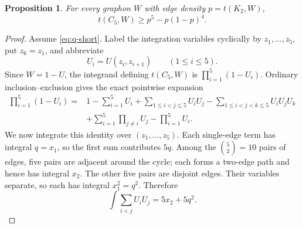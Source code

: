 \documentclass[11pt]{article}
\newtheorem{proposition}[theorem]{Proposition}
\begin{document}
\begin{proposition}\label{prop:C5}
For every graphon \(W\) with edge density \(p=t(K_2,W)\),
\[
       t(C_5,W)\ge p^5-p(1-p)^4.
\]
\end{proposition}

\begin{proof}
Assume \eqref{eq:q-short}.  Label the integration variables cyclically by
\(z_1,\ldots,z_5\), put \(z_6=z_1\), and abbreviate
\[
       U_i=U(z_i,z_{i+1})\qquad(1\le i\le5).
\]
Since \(W=1-U\), the integrand defining \(t(C_5,W)\) is
\(\prod_{i=1}^5(1-U_i)\).  Ordinary inclusion--exclusion gives the exact
pointwise expansion
\[
\begin{aligned}
 \prod_{i=1}^5(1-U_i)
 ={}&1-\sum_{i=1}^5U_i
     +\sum_{1\le i<j\le5}U_iU_j
     -\sum_{1\le i<j<k\le5}U_iU_jU_k\\
    &+\sum_{i=1}^5\prod_{j\ne i}U_j
     -\prod_{i=1}^5U_i.
\end{aligned}
\]
We now integrate this identity over \((z_1,\ldots,z_5)\).  Each single-edge
term has integral \(q=x_1\), so the first sum contributes \(5q\).  Among the
\(\binom52=10\) pairs of edges, five pairs are adjacent around the cycle;
each forms a two-edge path and hence has integral \(x_2\).  The other five
pairs are disjoint edges.  Their variables separate, so each has integral
\(x_1^2=q^2\).  Therefore
\[
       \int\sum_{i<j}U_iU_j=5x_2+5q^2.
\]


\end{proof}
\end{document}

